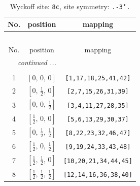 \documentclass[fleqn,8pt]{jsarticle}
\begin{document}
\renewcommand{\arraystretch}{1.2}
\begin{longtable}{ccc}
\caption{Wyckoff site: {\tt 8c}, site symmetry: {\tt .-3'.}}
 \\
 \hline \hline
No. & position & mapping \\ \hline \endfirsthead

\multicolumn{2}{l}{\tablename\ \thetable{}} \\
 \hline \hline
No. & position & mapping \\ \hline \endhead

 \hline \hline
\multicolumn{2}{r}{\footnotesize\it continued ...} \\ \endfoot

 \hline \hline
\multicolumn{2}{r}{} \\ \endlastfoot

1 & $\left[ 0,\, 0,\, 0 \right]$ & {\tt [1,17,18,25,41,42]} \\ \hline
2 & $\left[ 0,\, \frac{1}{2},\, 0 \right]$ & {\tt [2,7,15,26,31,39]} \\ \hline
3 & $\left[ 0,\, 0,\, \frac{1}{2} \right]$ & {\tt [3,4,11,27,28,35]} \\ \hline
4 & $\left[ \frac{1}{2},\, 0,\, 0 \right]$ & {\tt [5,6,13,29,30,37]} \\ \hline
5 & $\left[ 0,\, \frac{1}{2},\, \frac{1}{2} \right]$ & {\tt [8,22,23,32,46,47]} \\ \hline
6 & $\left[ \frac{1}{2},\, 0,\, \frac{1}{2} \right]$ & {\tt [9,19,24,33,43,48]} \\ \hline
7 & $\left[ \frac{1}{2},\, \frac{1}{2},\, 0 \right]$ & {\tt [10,20,21,34,44,45]} \\ \hline
8 & $\left[ \frac{1}{2},\, \frac{1}{2},\, \frac{1}{2} \right]$ & {\tt [12,14,16,36,38,40]} \\
\end{longtable}
\renewcommand{\arraystretch}{1.2}
\end{document}
